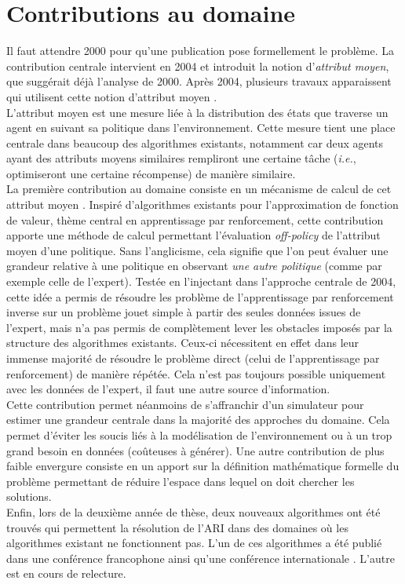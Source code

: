 \documentclass[11pt]{article}
\begin{document}
\section*{Contributions au domaine}
\label{sec-3}

  Il faut attendre 2000 pour qu'une publication pose formellement le problème. La contribution centrale intervient en 2004 et introduit la notion d'\emph{attribut moyen}, que suggérait déjà l'analyse de 2000. Après 2004, plusieurs travaux apparaissent qui utilisent cette notion d'attribut moyen .\\
  L'attribut moyen est une mesure liée à la distribution des états que traverse un agent en suivant sa politique dans l'environnement. Cette mesure tient une place centrale dans beaucoup des algorithmes existants, notamment car deux agents ayant des attributs moyens similaires rempliront une certaine tâche (\emph{i.e.}, optimiseront une certaine récompense) de manière similaire.\\

  La première contribution au domaine consiste en un mécanisme de calcul de cet attribut moyen \cite{klein2011batch}. Inspiré d'algorithmes existants pour l'approximation de fonction de valeur, thème central en apprentissage par renforcement, cette contribution apporte une méthode de calcul permettant l'évaluation \emph{off-policy} de l'attribut moyen d'une politique. Sans l'anglicisme, cela signifie que l'on peut évaluer une grandeur relative à une politique en observant \emph{une autre politique} (comme par exemple celle de l'expert). Testée en l'injectant dans l'approche centrale de 2004, cette idée a permis de résoudre les problème de l'apprentissage par renforcement inverse sur un problème jouet simple à partir des seules données issues de l'expert, mais n'a pas permis de complètement lever les obstacles imposés par la structure des algorithmes existants. Ceux-ci nécessitent en effet dans leur immense majorité de résoudre le problème direct (celui de l'apprentissage par renforcement) de manière répétée. Cela n'est pas toujours possible uniquement avec les données de l'expert, il faut une autre source d'information.\\
  Cette contribution permet néanmoins de s'affranchir d'un simulateur pour estimer une grandeur centrale dans la majorité des approches du domaine. Cela permet d'éviter les soucis liés à la modélisation de l'environnement ou à un trop grand besoin en données (coûteuses à générer).
  Une autre contribution de plus faible envergure consiste en un apport sur la définition mathématique formelle du problème \cite{klein2011dimensionality} permettant de réduire l'espace dans lequel on doit chercher les solutions.\\
  Enfin, lors de la deuxième année de thèse, deux nouveaux algorithmes ont été trouvés qui permettent la résolution de l'ARI dans des domaines où les algorithmes existant ne fonctionnent pas. L'un de ces algorithmes a été publié dans une conférence francophone \cite{Supelec773} ainsi qu'une conférence internationale \cite{klein2012}. L'autre est en cours de relecture.
\end{document}
